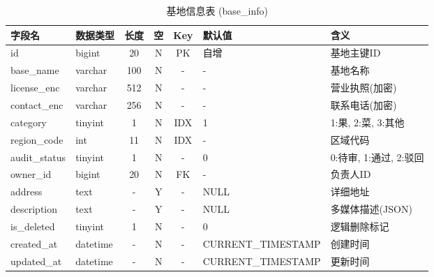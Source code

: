\documentclass[UTF8,a4paper,12pt]{article}
\begin{document}
\begin{table}[H]
    \centering
    \caption{基地信息表 (base\_info)}
    \label{tab:base_info}
    \small
    \renewcommand{\arraystretch}{1.3}
    \begin{tabular}{|l|l|c|c|c|l|l|}
        \hline
        \rowcolor{gray!15} \textbf{字段名} & \textbf{数据类型} & \textbf{长度} & \textbf{空} & \textbf{Key} & \textbf{默认值} & \textbf{含义} \\ \hline
        id & bigint & 20 & N & PK & 自增 & 基地主键ID \\ \hline
        base\_name & varchar & 100 & N & - & - & 基地名称 \\ \hline
        license\_enc & varchar & 512 & N & - & - & 营业执照(加密) \\ \hline
        contact\_enc & varchar & 256 & N & - & - & 联系电话(加密) \\ \hline
        category & tinyint & 1 & N & IDX & 1 & 1:果, 2:菜, 3:其他 \\ \hline
        region\_code & int & 11 & N & IDX & - & 区域代码 \\ \hline
        audit\_status & tinyint & 1 & N & - & 0 & 0:待审, 1:通过, 2:驳回 \\ \hline
        owner\_id & bigint & 20 & N & FK & - & 负责人ID \\ \hline
        address & text & - & Y & - & NULL & 详细地址 \\ \hline
        description & text & - & Y & - & NULL & 多媒体描述(JSON) \\ \hline
        is\_deleted & tinyint & 1 & N & - & 0 & 逻辑删除标记 \\ \hline
        created\_at & datetime & - & N & - & CURRENT\_TIMESTAMP & 创建时间 \\ \hline
        updated\_at & datetime & - & N & - & CURRENT\_TIMESTAMP & 更新时间 \\ \hline
    \end{tabular}
\end{table}
\end{document}
